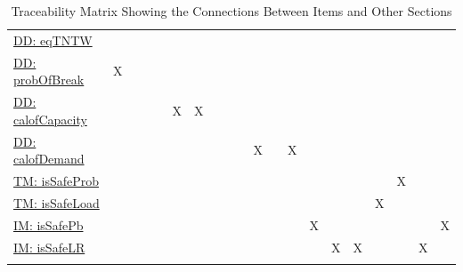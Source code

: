 \documentclass[12pt]{article}
\begin{document}
\begin{longtable}{l l l l l l l l l l l l l l l l l l l l}
\\
\hyperref[DD:eqTNTW]{DD: eqTNTW} &  &  &  &  &  &  &  &  &  &  &  &  &  &  &  &  &  &  & 
\\
\hyperref[DD:probOfBreak]{DD: probOfBreak} & X &  &  &  &  &  &  &  &  &  &  &  &  &  &  &  &  &  & 
\\
\hyperref[DD:calofCapacity]{DD: calofCapacity} &  &  &  &  & X & X &  &  &  &  &  &  &  &  &  &  &  &  & 
\\
\hyperref[DD:calofDemand]{DD: calofDemand} &  &  &  &  &  &  &  &  &  & X &  & X &  &  &  &  &  &  & 
\\
\hyperref[TM:isSafeProb]{TM: isSafeProb} &  &  &  &  &  &  &  &  &  &  &  &  &  &  &  &  & X &  & 
\\
\hyperref[TM:isSafeLoad]{TM: isSafeLoad} &  &  &  &  &  &  &  &  &  &  &  &  &  &  &  & X &  &  & 
\\
\hyperref[IM:isSafePb]{IM: isSafePb} &  &  &  &  &  &  &  &  &  &  &  &  & X &  &  &  &  &  & X
\\
\hyperref[IM:isSafeLR]{IM: isSafeLR} &  &  &  &  &  &  &  &  &  &  &  &  &  & X & X &  &  & X & 
\\
\bottomrule
\caption{Traceability Matrix Showing the Connections Between Items and Other Sections}
\label{Table:TraceMatRefvsRef}
\end{longtable}
\end{document}
